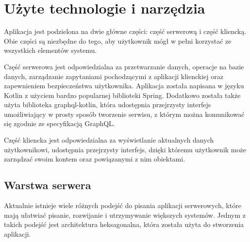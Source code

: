 \newpage
\section{Użyte technologie i narzędzia}
Aplikacja jest podzielona na dwie główne części: część serwerową i część kliencką. Obie części są niezbędne do tego, aby użytkownik mógł w pełni korzystać ze wszystkich elementów systemu.

Część serwerowa jest odpowiedzialna za przetwarzanie danych, operacje na bazie danych, zarządzanie zapytaniami pochodzącymi z aplikacji klienckiej oraz zapewnieniem bezpieczeństwa użytkownika. Aplikacja została napisana w języku Kotlin z użyciem bardzo popularnej biblioteki Spring. Dodatkowo została także użyta biblioteka graphql-kotlin, która udostępnia przejrzysty interfejs umożliwiający w prosty sposób tworzenie serwisu, z którym można komunikować się zgodnie ze specyfikacją GraphQL.


Część kliencka jest odpowiedzialna za wyświetlanie aktualnych danych użytkownikowi, udostępnia przejrzysty interfejs, dzięki któremu użytkownik może zarządzać swoim kontem oraz powiązanymi z nim obiektami.


\subsection{Warstwa serwera}
Aktualnie istnieje wiele różnych podejść do pisania aplikacji serwerowych, które mają ułatwiać pisanie, rozwijanie i utrzymywanie większych systemów. Jednym z takich podejść jest architektura heksagonalna, która została użyta do stworzenia aplikacji.
